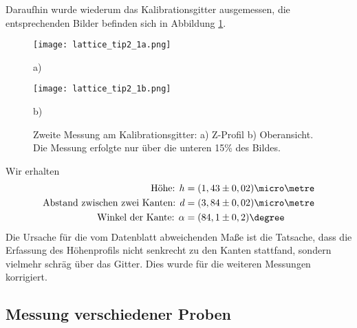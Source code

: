 Daraufhin wurde wiederum das Kalibrationsgitter ausgemessen, die entsprechenden Bilder befinden sich in Abbildung \ref{fig:Lattice3}.
\begin{figure}[h]
\centering
	\begin{minipage}{0.45\textwidth}
	\centering
		\texttt{[image: lattice\_tip2\_1a.png]}
		\caption*{a)}
	\end{minipage}
	\hfill
	\begin{minipage}{0.45\textwidth}
	\centering
		\texttt{[image: lattice\_tip2\_1b.png]}
		\caption*{b)}
	\end{minipage}
	\caption[Zweite Messung am Kalibrationsgitter]{Zweite Messung am Kalibrationsgitter: a) Z-Profil b) Oberansicht. Die Messung erfolgte nur über die unteren 15\% des Bildes.}
	\label{fig:Lattice3}
\end{figure}
Wir erhalten
\begin{align*}
\text{Höhe: }h&=(1,43\pm 0,02)\micro\metre\\
\text{Abstand zwischen zwei Kanten: }d&=(3,84 \pm 0,02)\micro\metre\\
\text{Winkel der Kante: }\alpha&=(84,1\pm 0,2)\degree
\end{align*}
Die Ursache für die vom Datenblatt abweichenden Maße ist die Tatsache, dass die Erfassung des Höhenprofils nicht senkrecht zu den Kanten stattfand, sondern vielmehr schräg über das Gitter. Dies wurde für die weiteren Messungen korrigiert.
\subsection{Messung verschiedener Proben}
